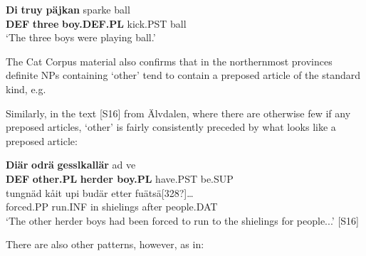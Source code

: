\ea\label{}
\gll \textbf{Di} \textbf{truy} \textbf{päjkan} sparke  ball\\
\textbf{DEF} \textbf{three} \textbf{boy.DEF.PL} kick.PST  ball\\
\glt ‘The three boys were playing ball.’
\z

The Cat Corpus material also confirms that in the northernmost provinces definite NPs containing ‘other’ tend to contain a preposed article of the standard kind, e.g. 

\ea\label{}
\z
\z 

Similarly, in the text [S16] from Älvdalen, where there are otherwise few if any preposed articles,  ‘other’ is fairly consistently preceded by what looks like a preposed article:

\ea\label{}
\gll \textbf{Diär} \textbf{odrä} \textbf{gesslkallär} ad  ve\\
\textbf{DEF} \textbf{other.PL} \textbf{herder boy.PL} have.PST  be.SUP\\
\gll tungnäd  kåit  upi  budär  etter  fuätsä[328?]…\\
forced.PP  run.INF  in  shielings  after  people.DAT\\
\glt ‘The other herder boys had been forced to run to the shielings for people...’ [S16]
\z

There are also other patterns, however, as in:

